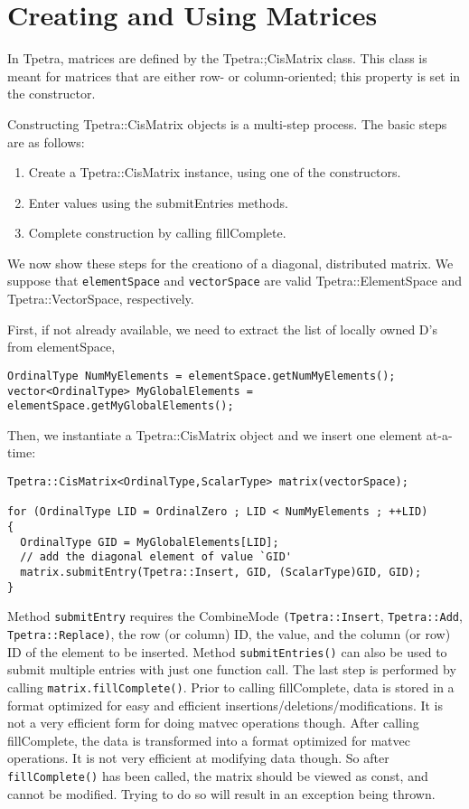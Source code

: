 \section{Creating and Using Matrices}
\label{sec:tpetra_matrices}

In Tpetra, matrices are defined by the Tpetra:;CisMatrix class. This class is
meant for matrices that are either row- or column-oriented; this property is
set in the constructor.

Constructing Tpetra::CisMatrix objects is a multi-step process. The basic
steps are as follows:
\begin{enumerate}
\itemsep=1pt
\item Create a Tpetra::CisMatrix instance, using one of the constructors.
\item Enter values using the submitEntries methods.
\item Complete construction by calling fillComplete.
\end{enumerate}
We now show these steps for the creationo of a diagonal, 
distributed matrix. We suppose that {\tt elementSpace} and
{\tt vectorSpace} are valid Tpetra::ElementSpace and Tpetra::VectorSpace,
  respectively.

First, if not already available, we need to extract the list of locally owned
D's from elementSpace,
\begin{verbatim}
OrdinalType NumMyElements = elementSpace.getNumMyElements();
vector<OrdinalType> MyGlobalElements = elementSpace.getMyGlobalElements();
\end{verbatim}
Then, we instantiate a Tpetra::CisMatrix object and we insert one element
at-a-time:
\begin{verbatim}
Tpetra::CisMatrix<OrdinalType,ScalarType> matrix(vectorSpace);

for (OrdinalType LID = OrdinalZero ; LID < NumMyElements ; ++LID)
{
  OrdinalType GID = MyGlobalElements[LID];
  // add the diagonal element of value `GID'
  matrix.submitEntry(Tpetra::Insert, GID, (ScalarType)GID, GID);
}
\end{verbatim}
Method {\tt submitEntry} requires the CombineMode 
{\tt (Tpetra::Insert}, {\tt Tpetra::Add}, \newline
{\tt Tpetra::Replace)}, the row (or column) ID, the
value, and the column (or row) ID of the
element to be inserted.  Method \verb!submitEntries()! can also be used to
submit multiple entries with just one function call. The last step is
performed by calling \verb!matrix.fillComplete()!. Prior
to calling fillComplete, data is stored in a format optimized for
easy and efficient insertions/deletions/modifications. It is not a
very efficient form for doing matvec operations though. After calling
fillComplete, the data is transformed into a format optimized for
matvec operations. It is not very efficient at modifying data though.
So after \verb!fillComplete()! has been called, the matrix should be viewed as
const, and cannot be modified. Trying to do so will result in an exception being thrown.

